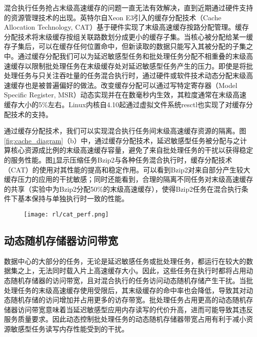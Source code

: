 混合执行任务抢占末级高速缓存的问题一直无法有效解决，直到近期通过硬件支持的资源管理技术的出现。英特尔自Xeon E3引入的缓存分配技术（Cache Allocation Technology, CAT）基于硬件实现了末级高速缓存按路分配管理\cite{guide2011intel}。缓存分配技术将末级缓存按组关联路数划分成更小的缓存子集。当核心被分配给某一缓存子集后，可以在缓存任何位置命中，但新读取的数据只能写入其被分配的子集之中。通过缓存分配我们可以为延迟敏感型任务和批处理任务分配不相重叠的末级高速缓存以限制批处理任务在末级缓存处对延迟敏感型任务产生的压力。即使是将批处理任务与只关注吞吐量的任务混合执行时，通过硬件或软件技术动态分配末级高速缓存也是被普遍偏好的做法\cite{cook2013hardware}\cite{iyer2007qos}\cite{qureshi2006utility}\cite{lin2008gaining}\cite{nathuji2010q}。改变缓存分配可以通过写特定寄存器（Model Specific Register, MSR）动态实现并在在数毫秒内生效，其粒度通常在末级高速缓存大小的5\%左右\cite{herdrich2016cache}。Linux内核自4.10起通过虚拟文件系统resctl也实现了对缓存分配技术的支持。

通过缓存分配技术，我们可以实现混合执行任务间末级高速缓存资源的隔离。图\ref{fig:cache_diagram}（b）中，通过缓存分配技术，延迟敏感型任务被分配与之计算核心资源成比例的末级高速缓存容量，避免了来自批处理任务的干扰以获得稳定的服务性能。图\ref{fig:cat_perf}显示压缩任务Bzip2与各种任务混合执行时，缓存分配技术（CAT）的使用对其性能的提高和稳定作用\cite{herdrich2016cache}。可以看到Bzip2对来自部分产生较大缓存压力的应用的干扰敏感；同时还能看到，合理的隔离不同任务对末级高速缓存的共享（实验中为Bzip2分配50\%的末级高速缓存），使得Bzip2任务在混合执行条件下基本保持与单独执行时一致的性能。

\begin{figure}
  \centering
    \centering
    \texttt{[image: rl/cat\_perf.png]}
    \label{fig:cat_perf}
\end{figure}

\subsection{动态随机存储器访问带宽}
数据中心的大部分的任务，无论是延迟敏感任务或批处理任务，都运行在较大的数据集之上，无法同时载入片上高速缓存大小。因此，这些任务在执行时都将占用动态随机存储器的访问带宽，且对混合执行的任务访问动态随机存储产生干扰。当批处理任务的末级高速缓存使用受限后，其末级缓存的命中率也会降低，导致其对动态随机存储的访问增加并占用更多的访存带宽。批处理任务占用更高的动态随机存储器访问带宽意味着当延迟敏感型应用内存读写的代价升高，进而可能导致其违反服务质量要求。因此动态控制批处理任务的动态随机存储器带宽占用有利于减小资源敏感型任务读写内存性能受到的干扰。


